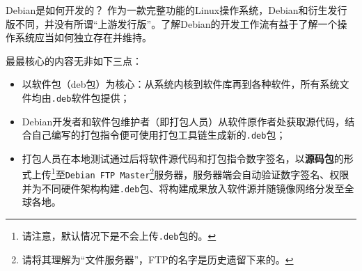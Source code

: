
\begin{frame}{Debian是如何开发的？}
	作为一款完整功能的Linux操作系统，Debian和衍生发行版不同，并没有所谓“上游发行版”。了解Debian的开发工作流有益于了解一个操作系统应当如何独立存在并维持。
	
	\vfill
	
	最最核心的内容无非如下三点：
	
	\begin{itemize}
		\item 以软件包（deb包）为核心：从系统内核到软件库再到各种软件，所有系统文件均由\texttt{.deb}软件包提供；
		\item Debian开发者和软件包维护者（即打包人员）从软件原作者处获取源代码，结合自己编写的打包指令便可使用打包工具链生成新的\texttt{.deb}包；
		\item 打包人员在本地测试通过后将软件源代码和打包指令数字签名，以\textbf{源码包}的形式上传\footnote{请注意，默认情况下是不会上传\texttt{.deb}包的。}至\texttt{Debian FTP Master}\footnote{请将其理解为“文件服务器”，FTP的名字是历史遗留下来的。}服务器，服务器端会自动验证数字签名、权限并为不同硬件架构构建\texttt{.deb}包、将构建成果放入软件源并随镜像网络分发至全球各地。
	\end{itemize}
	
\end{frame}

\begin{frame}
\end{frame}